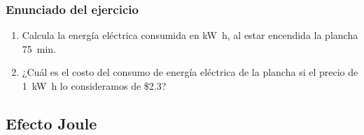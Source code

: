 \documentclass[14pt]{beamer}
\begin{document}
\begin{frame}
\frametitle{Enunciado del ejercicio}
\begin{enumerate}[<+->]
\conti
\item Calcula la energía eléctrica consumida en \unit{\kilo\watt\hour},  al estar encendida la plancha \SI{75}{\minute}.
\item ¿Cuál es el costo del consumo de energía eléctrica de la plancha si el precio de \SI{1}{\kilo\watt\hour } lo consideramos de \$\num{2.3}?
\end{enumerate}
\end{frame}

\subsection{Efecto Joule}
\end{document}
